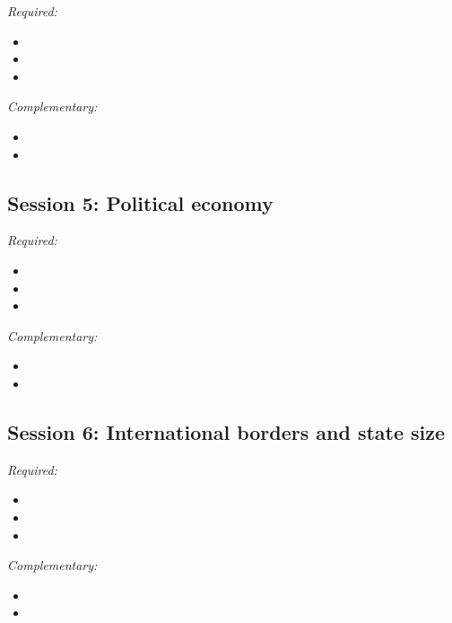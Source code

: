 \documentclass[12pt, a4paper]{article}
\begin{document}
\noindent\textit{Required:}

\begin{itemize}
  \item
  \item
  \item
\end{itemize}

\noindent\textit{Complementary:}

\begin{itemize}
  \item
  \item
\end{itemize}

\hline
\subsection*{Session 5: Political economy}

\noindent\textit{Required:}

\begin{itemize}
  \item
  \item
  \item
\end{itemize}

\noindent\textit{Complementary:}

\begin{itemize}
  \item
  \item
\end{itemize}

\hline
\subsection*{Session 6: International borders and state size}

\noindent\textit{Required:}

\begin{itemize}
  \item
  \item
  \item
\end{itemize}

\noindent\textit{Complementary:}

\begin{itemize}
  \item
  \item
\end{itemize}
\end{document}

